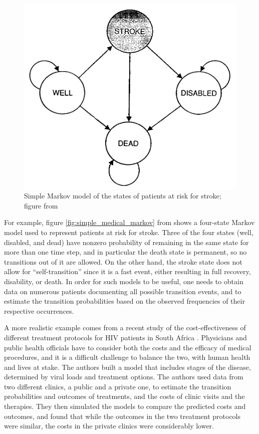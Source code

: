 \documentclass[
  letterpaper,
  DIV=11,
  numbers=noendperiod]{scrreprt}
\begin{document}
\begin{figure}

{\centering \includegraphics{./ch10/simple_medical_markov.png}

}

\caption{Simple Markov model of the states of patients at risk for
stroke; figure from \cite{sonnenberg_markov_1993}}

\end{figure}

For example, figure \ref{fig:simple_medical_markov} from
\cite{sonnenberg_markov_1993} shows a four-state Markov model used to
represent patients at risk for stroke. Three of the four states (well,
disabled, and dead) have nonzero probability of remaining in the same
state for more than one time step, and in particular the death state is
permanent, so no transitions out of it are allowed. On the other hand,
the stroke state does not allow for ``self-transition'' since it is a
fast event, either resulting in full recovery, disability, or death. In
order for such models to be useful, one needs to obtain data on numerous
patients documenting all possible transition events, and to estimate the
transition probabilities based on the observed frequencies of their
respective occurrences.

A more realistic example comes from a recent study of the
cost-effectiveness of different treatment protocols for HIV patients in
South Africa \cite{leisegang_novel_2013}. Physicians and public health
officials have to consider both the costs and the efficacy of medical
procedures, and it is a difficult challenge to balance the two, with
human health and lives at stake. The authors built a model that includes
stages of the disease, determined by viral loads and treatment options.
The authors used data from two different clinics, a public and a private
one, to estimate the transition probabilities and outcomes of
treatments, and the costs of clinic visits and the therapies. They then
simulated the models to compare the predicted costs and outcomes, and
found that while the outcomes in the two treatment protocols were
similar, the costs in the private clinics were considerably lower.
\end{document}
